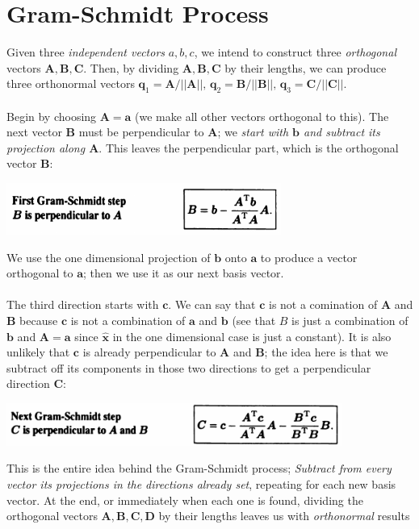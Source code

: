 \documentclass{report}
\begin{document}
\section{Gram-Schmidt Process}
Given three \textit{independent vectors} $a,b,c$, we intend to construct three \textit{orthogonal} vectors $\bm A,\bm B,\bm C$. Then, by dividing $\bm A,\bm B,\bm C$ by
their lengths, we can produce three orthonormal vectors $\bm q_1=\bm A/||\bm A||,\,\bm q_2=\bm B/||\bm B||,\,\bm q_3=\bm C/||\bm C||$.\\
\vspace{1mm}\\
Begin by choosing $\bm A=\bm a$ (we make all other vectors orthogonal to this). The next vector $\bm B$ must be perpendicular to $\bm A$; we \textit{start with $\bm b$ and
subtract its projection along $\bm A$}. This leaves the perpendicular part, which
is the orthogonal vector $\bm B$:
\begin{center}
\includegraphics[width=9cm]{87}
\end{center}
We use the one dimensional projection  of $\bm b$ onto $\bm a$ to produce a vector orthogonal to $\bm a$; then we use it as our next basis vector.\\
\vspace{1mm}\\
The third direction starts with $\bm c$. We can say that $\bm c$ is not a comination of $\bm A$ and $\bm B$ because $\bm c$ is not a combination of $\bm a$ and $\bm b$
(see that $B$ is just a combination of $\bm b$ and $\bm A=\bm a$ since $\hat{\bm x}$ in the one dimensional case is just a constant).
It is also unlikely that $\bm c$ is already perpendicular to $\bm A$ and $\bm B$; the idea here is that we subtract off its components in those two directions to get a
perpendicular direction $\bm C$:
\begin{center}
\includegraphics[width=11cm]{88}
\end{center}
This is the entire idea behind the Gram-Schmidt process; \textit{Subtract from every vector its projections in the directions already set}, repeating for each new basis 
vector. At the end, or immediately when each one is found, dividing the orthogonal vectors $\bm{A,B,C,D}$ by their lengths leaves us with \textit{orthonormal} results 
\end{document}

